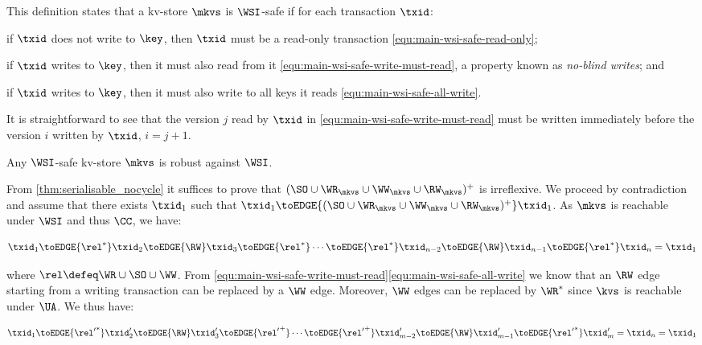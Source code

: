 This definition states that a kv-store $\mkvs$ is \(\WSI\)-safe if for each transaction $\txid$: 
\begin{enumerate*} 
    \item if $\txid$ does not write to $\key$, then $\txid$ must be a read-only transaction \eqref{equ:main-wsi-safe-read-only}; 
    \item if \( \txid \) writes to $\key$, then it must also read from it \eqref{equ:main-wsi-safe-write-must-read}, a property known as \emph{no-blind writes}; and
	\item if \( \txid \) writes to $\key$, then it must also write to all keys it reads \eqref{equ:main-wsi-safe-all-write}.
\end{enumerate*}
It is straightforward to see that the version $j$ read by \( \txid \) in \eqref{equ:main-wsi-safe-write-must-read} must be written immediately before the version $i$ written by \( \txid \), \ie \( i {=} j + 1 \).

\spaceshrink{-5pt}
\begin{theorem}
 \label{thm:main-wsi-robust}
    Any \(\WSI\)-safe kv-store \( \mkvs \) is robust against \(\WSI\).   
\end{theorem}
\spaceshrink{-5pt}

\noindent From \cref{thm:serialisable_nocycle} it suffices to prove that $(\SO \cup \WR_{\mkvs} \cup \WW_{\mkvs} \cup \RW_{\mkvs})^{+}$ is irreflexive.
We proceed by contradiction and assume that there exists $\txid_1$ such that $\txid_1 \toEDGE{(\SO \cup \WR_{\mkvs} \cup \WW_{\mkvs} \cup \RW_{\mkvs})^{+}} \txid_1$. 
As \( \mkvs \) is reachable under \( \WSI \) and thus \( \CC \), we have:%

\spaceshrink{-5pt}
{\displaymathfont
\[
    \txid_1 \toEDGE{\rel^*} \txid_2 \toEDGE{\RW} \txid_3 \toEDGE{\rel^*} \cdots \toEDGE{\rel^*} \txid_{n-2} \toEDGE{\RW} \txid_{n-1} \toEDGE{\rel^*} \txid_n = \txid_1
\]
\normalsize}%
\spaceshrink{-10pt}
 
\noindent{}where \( \rel \defeq \WR \cup \SO \cup \WW \).
From \eqref{equ:main-wsi-safe-write-must-read}\eqref{equ:main-wsi-safe-all-write} we know that 
an \( \RW \) edge starting from a writing transaction can be replaced by a \( \WW \) edge.
Moreover, \( \WW \) edges can be replaced by \( \WR^* \) since \( \kvs \) is reachable under \( \UA \).
We thus have:

\spaceshrink{-5pt}
{\displaymathfont
\[
    \txid_1 \toEDGE{{\rel'}^*} \txid'_2 \toEDGE{\RW} \txid'_3 \toEDGE{{\rel'}^+} \cdots \toEDGE{{\rel'}^+} \txid'_{m-2} \toEDGE{\RW} \txid'_{m-1} \toEDGE{{\rel'}^*} \txid'_m = \txid_n = \txid_1
\]
\normalsize}
\spaceshrink{-10pt}

